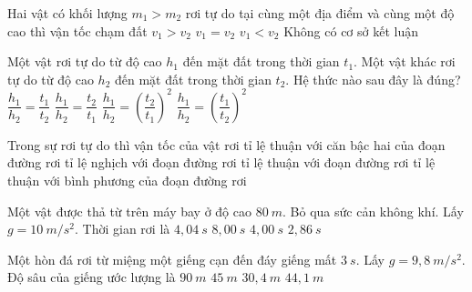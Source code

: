 \begin{ex}%
Hai vật có khối lượng $m_1>m_2$ rơi tự do tại cùng một địa điểm và cùng một độ cao thì vận tốc chạm đất 
\choice
{$v_1>v_2$}
{\True $v_1=v_2$}
{$v_1<v_2$}
{Không có cơ sở kết luận}
\loigiai{
}
 \end{ex}
\begin{ex}%
Một vật rơi tự do từ độ cao $h_1$ đến mặt đất trong thời gian $t_1$. Một vật khác rơi tự do từ độ cao $h_2$ đến mặt đất trong thời gian $t_2$. Hệ thức nào sau đây là đúng?
\choice
{$\dfrac{h_1}{h_2}=\dfrac{t_1}{t_2}$}
{$\dfrac{h_1}{h_2}=\dfrac{t_2}{t_1}$}
{$\dfrac{h_1}{h_2}=\left(\dfrac{t_2}{t_1}\right)^2$}
{\True $\dfrac{h_1}{h_2}=\left(\dfrac{t_1}{t_2}\right)^2$}

\end{ex}

\begin{ex}%
Trong sự rơi tự do thì vận tốc của vật rơi 
\choice
{\True tỉ lệ thuận với căn bậc hai của đoạn đường rơi}
{tỉ lệ nghịch với đoạn đường rơi}
{tỉ lệ thuận với đoạn đường rơi}
{tỉ lệ thuận với bình phương của đoạn đường rơi}
\loigiai{
}
 \end{ex}
\begin{ex}%
Một vật được thả từ trên máy bay ở độ cao $80\ m$. Bỏ qua sức cản không khí. Lấy $g = 10\ m/s^2$. Thời gian rơi là	
\choice
{$4,04\ s$}
{$8,00\ s$}
{\True $4,00\ s$}
{$2,86\ s$}	
 \end{ex}
\begin{ex}%
Một hòn đá rơi từ miệng một giếng cạn đến đáy giếng mất $3\ s$. Lấy $g=9,8\ m/s^2$. Độ sâu của giếng ước lượng là
\choice
{$90\ m$}
{$45\ m$}
{$30,4\ m$}
{\True $44,1\ m$}	
 \end{ex}

